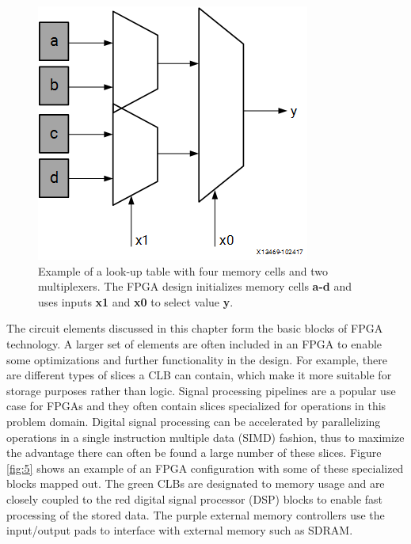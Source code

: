 \documentclass[12pt]{report}
\begin{document}
\begin{figure}[h]
    \centering
    \includegraphics[scale=0.5]{figures/lut.png}
    \caption{Example of a look-up table with four memory cells and two multiplexers. The FPGA design initializes memory cells \textbf{a-d} and uses inputs \textbf{x1} and \textbf{x0} to select value \textbf{y}. \citep{XilFPGAIntro}}
    \label{fig:4}
\end{figure}

The circuit elements discussed in this chapter form the basic blocks of FPGA technology. A larger set of elements are often included in an FPGA to enable some optimizations and further functionality in the design. For example, there are different types of slices a CLB can contain, which make it more suitable for storage purposes rather than logic. Signal processing pipelines are a popular use case for FPGAs and they often contain slices specialized for operations in this problem domain. Digital signal processing can be accelerated by parallelizing operations in a single instruction multiple data (SIMD) fashion, thus to maximize the advantage there can often be found a large number of these slices. Figure \ref{fig:5} shows an example of an FPGA configuration with some of these specialized blocks mapped out. The green CLBs are designated to memory usage and are closely coupled to the red digital signal processor (DSP) blocks to enable fast processing of the stored data. The purple external memory controllers use the input/output pads to interface with external memory such as SDRAM. \citep{XilFPGAIntro} \citep{XilClbMan}
\end{document}

